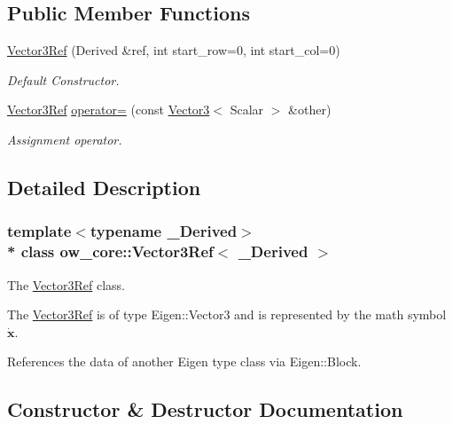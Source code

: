 \subsection*{Public Member Functions}
\begin{DoxyCompactItemize}
\item 
\hyperlink{classow__core_1_1Vector3Ref_a02bd0be6dd1d3b2ee965d21dd2e290c3}{Vector3\+Ref} (Derived \&ref, int start\+\_\+row=0, int start\+\_\+col=0)
\begin{DoxyCompactList}\small\item\em Default Constructor. \end{DoxyCompactList}\item 
\hyperlink{classow__core_1_1Vector3Ref}{Vector3\+Ref} \hyperlink{classow__core_1_1Vector3Ref_a6c50d97d145b443b39f2d773b901fd1e}{operator=} (const \hyperlink{classow__core_1_1Vector3}{Vector3}$<$ Scalar $>$ \&other)\hypertarget{classow__core_1_1Vector3Ref_a6c50d97d145b443b39f2d773b901fd1e}{}\label{classow__core_1_1Vector3Ref_a6c50d97d145b443b39f2d773b901fd1e}

\begin{DoxyCompactList}\small\item\em Assignment operator. \end{DoxyCompactList}\end{DoxyCompactItemize}


\subsection{Detailed Description}
\subsubsection*{template$<$typename \+\_\+\+Derived$>$\\*
class ow\+\_\+core\+::\+Vector3\+Ref$<$ \+\_\+\+Derived $>$}

The \hyperlink{classow__core_1_1Vector3Ref}{Vector3\+Ref} class. 

The \hyperlink{classow__core_1_1Vector3Ref}{Vector3\+Ref} is of type Eigen\+::\+Vector3 and is represented by the math symbol $\dot{\mathbf{x}}$.

References the data of another Eigen type class via Eigen\+::\+Block. 

\subsection{Constructor \& Destructor Documentation}
